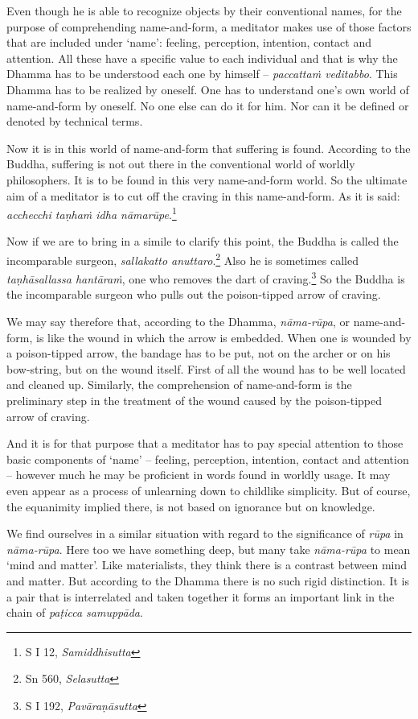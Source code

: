 Even though he is able to recognize objects by their conventional names, for the purpose of comprehending name-and-form, a meditator makes use of those factors that are included under `name': feeling, perception, intention, contact and attention. All these have a specific value to each individual and that is why the Dhamma has to be understood each one by himself -- \emph{paccattaṁ veditabbo}. This Dhamma has to be realized by oneself. One has to understand one's own world of name-and-form by oneself. No one else can do it for him. Nor can it be defined or denoted by technical terms.

Now it is in this world of name-and-form that suffering is found. According to the Buddha, suffering is not out there in the conventional world of worldly philosophers. It is to be found in this very name-and-form world. So the ultimate aim of a meditator is to cut off the craving in this name-and-form. As it is said: \emph{acchecchi taṇhaṁ idha nāmarūpe}.\footnote{S I 12, \emph{Samiddhisutta}}

Now if we are to bring in a simile to clarify this point, the Buddha is called the incomparable surgeon, \emph{sallakatto anuttaro}.\footnote{Sn 560, \emph{Selasutta}} Also he is sometimes called \emph{taṇhāsallassa hantāraṁ}, one who removes the dart of craving.\footnote{S I 192, \emph{Pavāraṇāsutta}} So the Buddha is the incomparable surgeon who pulls out the poison-tipped arrow of craving.

We may say therefore that, according to the Dhamma, \emph{nāma-rūpa}, or name-and-form, is like the wound in which the arrow is embedded. When one is wounded by a poison-tipped arrow, the bandage has to be put, not on the archer or on his bow-string, but on the wound itself. First of all the wound has to be well located and cleaned up. Similarly, the comprehension of name-and-form is the preliminary step in the treatment of the wound caused by the poison-tipped arrow of craving.

And it is for that purpose that a meditator has to pay special attention to those basic components of `name' -- feeling, perception, intention, contact and attention -- however much he may be proficient in words found in worldly usage. It may even appear as a process of unlearning down to childlike simplicity. But of course, the equanimity implied there, is not based on ignorance but on knowledge.

We find ourselves in a similar situation with regard to the significance of \emph{rūpa} in \emph{nāma-rūpa}. Here too we have something deep, but many take \emph{nāma-rūpa} to mean `mind and matter'. Like materialists, they think there is a contrast between mind and matter. But according to the Dhamma there is no such rigid distinction. It is a pair that is interrelated and taken together it forms an important link in the chain of \emph{paṭicca samuppāda}.

